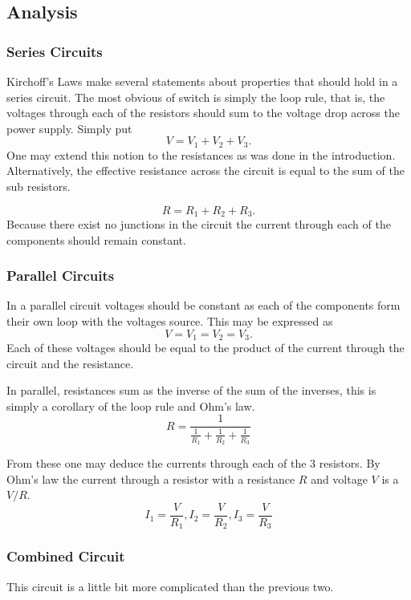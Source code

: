 \documentclass[11pt]{article}
\begin{document}
\subsection{Analysis}
\subsubsection{Series Circuits}
Kirchoff's Laws make several statements about properties that should hold in a series circuit. The most obvious of switch is simply the loop rule, that is, the voltages through each of the resistors should sum to the voltage drop across the power supply. Simply put
\begin{equation}
V = V_1 + V_2 + V_3.
\end{equation}
One may extend this notion to the resistances as was done in the introduction. Alternatively, the effective resistance across the circuit is equal to the sum of the sub resistors.

\begin{equation}
R = R_1 + R_2 + R_3.
\end{equation}
Because there exist no junctions in the circuit the current through each of the components should remain constant.
\subsubsection{Parallel Circuits}
In a parallel circuit voltages should be constant as each of the components form their own loop with the voltages source.  This may be expressed as 
\begin{equation}
V = V_1 = V_2 = V_3.
\end{equation}
Each of these voltages should be equal to the product of the current through the circuit and the resistance.

In parallel, resistances sum as the inverse of the sum of the inverses, this is simply a  corollary of the loop rule and Ohm's law.
\begin{equation}
R = \frac{1}{ \frac{1}{R_1} + \frac{1}{R_2} + \frac{1}{R_3}  }
\end{equation}

From these one may deduce the currents through each of the 3 resistors. By Ohm's law the current through a resistor with a resistance \(R\) and voltage \(V\) is a \(V / R \). 
\begin{equation}
I_1 = \frac{V}{R_1},I_2 = \frac{V}{R_2},I_3 = \frac{V}{R_3}
\end{equation}
\subsubsection{Combined Circuit}
This circuit is a little bit more complicated than the previous two. 
\end{document}
